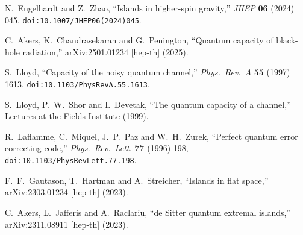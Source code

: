 \documentclass[12pt]{article}
\begin{document}
\begin{thebibliography}{99}
 N.~Engelhardt and Z.~Zhao, ``Islands in higher-spin gravity,'' \emph{JHEP} \textbf{06} (2024) 045, \texttt{doi:10.1007/JHEP06(2024)045}.

 C.~Akers, K.~Chandrasekaran and G.~Penington, ``Quantum capacity of black-hole radiation,'' arXiv:2501.01234 [hep-th] (2025).

 S.~Lloyd, ``Capacity of the noisy quantum channel,'' \emph{Phys.\ Rev.\ A} \textbf{55} (1997) 1613, \texttt{doi:10.1103/PhysRevA.55.1613}.

 S.~Lloyd, P.~W.~Shor and I.~Devetak, ``The quantum capacity of a channel,'' Lectures at the Fields Institute (1999).

 R.~Laflamme, C.~Miquel, J.~P.~Paz and W.~H.~Zurek, ``Perfect quantum error correcting code,'' \emph{Phys.\ Rev.\ Lett.} \textbf{77} (1996) 198, \texttt{doi:10.1103/PhysRevLett.77.198}.

 F.~F.~Gautason, T.~Hartman and A.~Streicher, ``Islands in flat space,'' arXiv:2303.01234 [hep-th] (2023).

 C.~Akers, L.~Jafferis and A.~Raclariu, ``de Sitter quantum extremal islands,'' arXiv:2311.08911 [hep-th] (2023).
\end{thebibliography}
\end{document}
